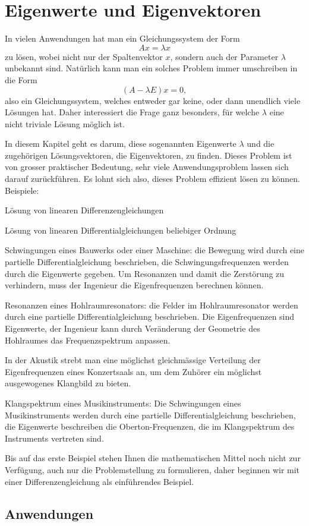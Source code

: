%
%
%
\chapter{Eigenwerte und Eigenvektoren\label{chapter-eigen}}
\rhead{}
In vielen Anwendungen hat man ein Gleichungssystem der Form
\[
Ax=\lambda x
\]
zu lösen, wobei nicht nur der Spaltenvektor $x$, sondern auch der
Parameter $\lambda$ unbekannt sind.
Natürlich kann man ein solches Problem immer umschreiben in die Form
\[
(A-\lambda E) x=0,
\]
also ein Gleichungssystem, welches entweder gar keine, oder dann
unendlich viele Lösungen hat.
Daher interessiert die Frage 
ganz besonders, für welche $\lambda$ eine nicht triviale Lösung möglich ist.

In diesem Kapitel geht es darum, diese sogenannten Eigenwerte $\lambda$
und die zugehörigen Lösungsvektoren, die Eigenvektoren, zu finden.
Dieses
Problem ist von grosser praktischer Bedeutung, sehr viele Anwendungsproblem
lassen sich darauf zurückführen.
Es lohnt sich also, dieses Problem
effizient lösen zu können.
Beispiele:
\begin{compactitem}
\item Lösung von linearen Differenzengleichungen
\item Lösung von linearen Differentialgleichungen beliebiger Ordnung
\item Schwingungen eines Bauwerks oder einer Maschine: die Bewegung wird durch
eine partielle Differentialgleichung beschrieben, die Schwingungsfrequenzen
werden durch die Eigenwerte gegeben.
Um Resonanzen und damit die Zerstörung
zu verhindern, muss der Ingenieur die Eigenfrequenzen
berechnen können.
\item Resonanzen eines Hohlraumresonators: die Felder im Hohlraumresonator
werden durch eine partielle Differentialgleichung beschrieben.
Die Eigenfrequenzen sind Eigenwerte, der Ingenieur kann durch Veränderung
der Geometrie des Hohlraumes das Frequenzspektrum anpassen.
\item
{}
In der
Akustik strebt man eine möglichst gleichmässige Verteilung der Eigenfrequenzen
eines Konzertsaals an, um dem Zuhörer ein möglichst ausgewogenes Klangbild
zu bieten.
\item Klangspektrum eines Musikinstruments: Die Schwingungen eines Musikinstruments
werden durch eine partielle Differentialgleichung beschrieben, die
Eigenwerte beschreiben die Oberton-Frequenzen, die im Klangspektrum des
Instruments vertreten sind.
\end{compactitem}
Bis auf das erste Beispiel stehen Ihnen die mathematischen Mittel noch nicht
zur Verfügung, auch nur die Problemstellung zu formulieren, daher beginnen
wir mit einer Differenzengleichung als einführendes Beispiel.







\section{Anwendungen}


